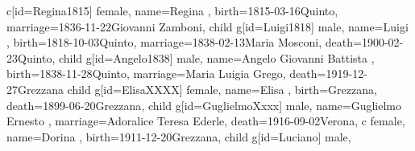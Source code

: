 \documentclass{article}
\begin{document}
\begin{midpage}
\begin{center}
\begin{genealogypicture}
{{{{{{{{                            }
                            c[id=Regina1815]{
                                female,
                                name={Regina },
                                birth={1815-03-16}{Quinto},
                                marriage={1836-11-22}{Giovanni Zamboni},
                            }
                            child{
                                g[id=Luigi1818]{
                                    male,
                                    name={Luigi },
                                    birth={1818-10-03}{Quinto},
                                    marriage={1838-02-13}{Maria Mosconi},
                                    death={1900-02-23}{Quinto},
                                }
                                child{
                                    g[id=Angelo1838]{
                                        male,
                                        name={Angelo Giovanni Battista },
                                        birth={1838-11-28}{Quinto},
                                        marriage={Maria Luigia Grego}{},
                                        death={1919-12-27}{Grezzana}
                                    }
                                    child{
                                        g[id=ElisaXXXX]{
                                            female,
                                            name={Elisa },
                                            birth={Grezzana}{},
                                            death={1899-06-20}{Grezzana},
                                        }
                                    }
                                    child{
                                        g[id=GuglielmoXxxx]{
                                            male,
                                            name={Guglielmo Ernesto },
                                            marriage={Adoralice Teresa Ederle}{},
                                            death={1916-09-02}{Verona},
                                        }
                                        c{
                                            female,
                                            name={Dorina },
                                            birth={1911-12-20}{Grezzana},
                                        }
                                    }
                                    child{
                                        g[id=Luciano]{
                                            male,
}}}}}}}}}}}
\end{genealogypicture}
\end{center}
\end{midpage}
\end{document}
